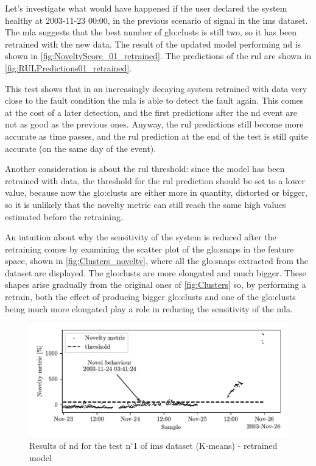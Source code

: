 Let's investigate what would have happened if the user declared the system healthy at 2003-11-23 00:00, in the previous scenario of   signal in the \gls{ims} dataset. The \gls{mla} suggests that the best number of \gls{glo:clust}s is still two, so it has been retrained with the new data. The result of the updated model performing \gls{nd} is shown in \autoref{fig:NoveltyScore_01_retrained}. The predictions of the \gls{rul} are shown in \autoref{fig:RULPredictions01_retrained}. 

This test shows that in an increasingly decaying system retrained with data very close to the fault condition the \gls{mla} is able to detect the fault again. This comes at the cost of a later detection, and the first predictions after the \gls{nd} event are not as good as the previous ones. Anyway, the \gls{rul} predictions still become more accurate as time passes, and the \gls{rul} prediction at the end of the test is still quite accurate (on the same day of the event). 

Another consideration is about the \gls{rul} threshold: since the model has been retrained with  data, the threshold for the \gls{rul} prediction should be set to a lower value, because now the \gls{glo:clust}s are either more in quantity, distorted or bigger, so it is unlikely that the novelty metric can still reach the same high values estimated before the retraining.

An intuition about why the sensitivity of the system is reduced after the retraining comes by examining the scatter plot of the \gls{glo:snap}s in the feature space, shown in \autoref{fig:Clusters_novelty}, where all the \gls{glo:snap}s extracted from the dataset are displayed. The \gls{glo:clust}s are more elongated and much bigger. These shapes arise gradually from the original ones of \autoref{fig:Clusters} so, by performing a retrain, both the effect of producing bigger \gls{glo:clust}s and one of the \gls{glo:clust}s being much more elongated play a role in reducing the sensitivity of the \gls{mla}.

\begin{figure}
    \centering
    \includegraphics{images/IMS/Novelty_01_500samples_bearing3x_retrained.pdf}
    \caption{Results of \gls{nd} for the test $\text{n}^\circ$1 of \gls{ims} dataset (K-means) - retrained model}
    \label{fig:NoveltyScore_01_retrained}
\end{figure}

